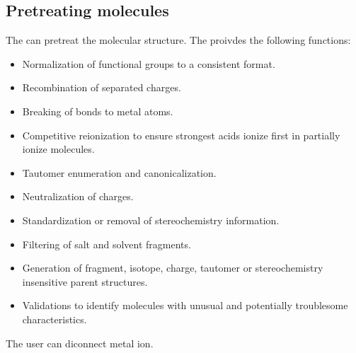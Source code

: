 \documentclass[letterpaper,10pt,english]{sphinxmanual}
\begin{document}
\subsection{Pretreating molecules}
\label{User_guide:pretreating-molecules}
The {\hyperref[reference/PyPretreatMol:module\string-PyPretreatMol]{}} can pretreat the molecular structure. The {\hyperref[reference/PyPretreatMol:module\string-PyPretreatMol]{}} proivdes the following functions:
\begin{itemize}
\item {} 
Normalization of functional groups to a consistent format.

\item {} 
Recombination of separated charges.

\item {} 
Breaking of bonds to metal atoms.

\item {} 
Competitive reionization to ensure strongest acids ionize first in partially ionize molecules.

\item {} 
Tautomer enumeration and canonicalization.

\item {} 
Neutralization of charges.

\item {} 
Standardization or removal of stereochemistry information.

\item {} 
Filtering of salt and solvent fragments.

\item {} 
Generation of fragment, isotope, charge, tautomer or stereochemistry insensitive parent structures.

\item {} 
Validations to identify molecules with unusual and potentially troublesome characteristics.

\end{itemize}

The user can diconnect metal ion.
\end{document}
